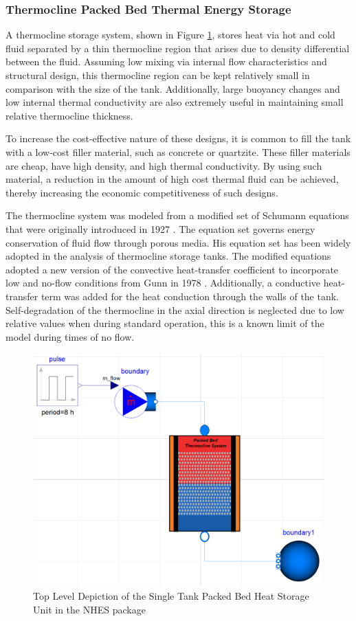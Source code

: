 \subsubsection{Thermocline Packed Bed Thermal Energy Storage}
A thermocline storage system, shown in Figure \ref{Top View Thermocline}, stores heat via hot and cold fluid separated by a thin thermocline region that arises due to density differential between the fluid. Assuming low mixing via internal flow characteristics and structural design, this thermocline region can be kept relatively small in comparison with the size of the tank. Additionally, large buoyancy changes and low internal thermal conductivity are also extremely useful in maintaining small relative thermocline thickness.

To increase the cost-effective nature of these designs, it is common to fill the tank with a low-cost filler material, such as concrete or quartzite. These filler materials are cheap, have high density, and high thermal conductivity. By using such material, a reduction in the amount of high cost thermal fluid can be achieved, thereby increasing the economic competitiveness of such designs.

The thermocline system was modeled from a modified set of Schumann equations that were originally introduced in 1927 \cite{Schumann}. The equation set governs energy conservation of fluid flow through porous media. His equation set has been widely adopted in the analysis of thermocline storage tanks. The modified equations adopted a new version of the convective heat-transfer coefficient to incorporate low and no-flow conditions from Gunn in 1978 \cite{specialHeattransfer}. Additionally, a conductive heat-transfer term was added for the heat conduction through the walls of the tank. Self-degradation of the thermocline in the axial direction is neglected due to low relative values when during standard operation, this is a known limit of the model during times of no flow.

\begin{figure}[hbtp]
\centering
\includegraphics[scale=0.3]{pics/Thermocline_Test.png}
\caption{Top Level Depiction of the Single Tank Packed Bed Heat Storage Unit in the NHES package}
\label{Top View Thermocline}
\end{figure}

